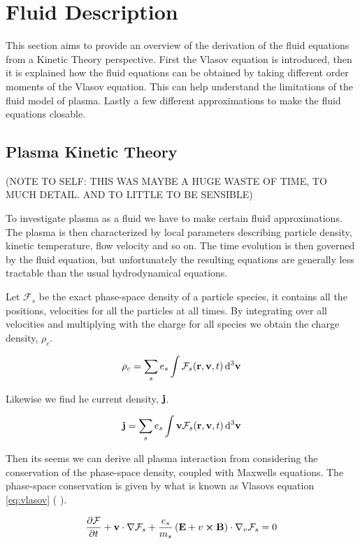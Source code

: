 \section{Fluid Description}
	This section aims to provide an overview of the derivation of the fluid equations
	from a Kinetic Theory perspective. First the Vlasov equation is introduced,
	then it is explained how the fluid equations can be obtained by taking different
	order moments of the Vlasov equation. This can help understand the limitations
	of the fluid model of plasma. Lastly a few different approximations
	to make the fluid equations closable.

\subsection{Plasma Kinetic Theory}
	(NOTE TO SELF: THIS WAS MAYBE A HUGE WASTE OF TIME, TO MUCH DETAIL. AND TO LITTLE
	TO BE SENSIBLE)

	To investigate plasma as a fluid we have to make certain fluid approximations.
	The plasma is then characterized by local parameters describing particle
	density, kinetic temperature, flow velocity and so on. The time evolution
	is then governed by the fluid equation, but unfortunately the resulting
	equations are generally less tractable than the usual hydrodynamical
	equations.

	Let \(\mathcal{F}_s\) be the exact phase-space density of a particle species,
	it contains all the positions, velocities for all the particles at
	all times. By integrating over all velocities and multiplying with the charge
	for all species we obtain the charge density, \(\rho_c\).

	\[\rho_c = \sum_s e_s \int \mathcal{F}_s(\vb{r},\vb{v},t)\dd[3]{\vb{v}}\]

	Likewise we find he current density, \(\vb{j}\).

	\[\vb{j} = \sum_s e_s \int \vb{v}\mathcal{F}_s(\vb{r},\vb{v},t)\dd[3]{\vb{v}}\]

	Then its seems we can derive all plasma interaction from considering
	the conservation of the phase-space density, coupled with Maxwells equations.
	The phase-space conservation is given by what is known as Vlasovs equation \cref{eq:vlasov}
	(\textit{} \cite{pecseli_waves_2012}).

	\begin{align}
		\pdv{\mathcal{F}}{t} + \vb{v}\cdot\nabla\mathcal{F}_s + \frac{e_s}{m_s}\left( \vb{E} + v\cross\vb{B} \right) \cdot \nabla_v\mathcal{F}_s = 0 \label{eq:vlasov}
	\end{align}

